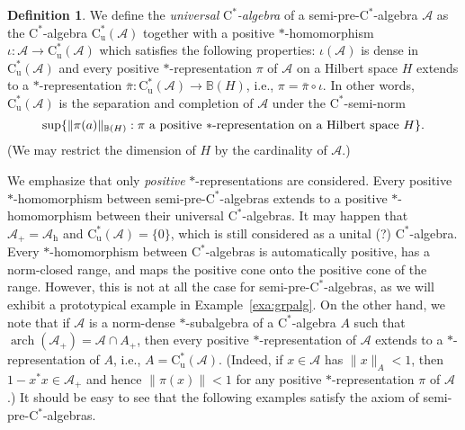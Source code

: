 \documentclass[12pt]{amsart}
\theoremstyle{definition}
\newtheorem*{defn}{Definition}
\begin{document}
\begin{defn}
We define the \emph{universal} \emph{$\mathrm{C}^*$-algebra}
of a {semi-pre-$\mathrm{C}^*$-alge\-bra\xspace} ${{\mathcal A}}$
as the {$\mathrm{C}^*$-alge\-bra\xspace} $\mathrm{C}^*_{\mathrm{u}}({{\mathcal A}})$ together with a positive {$*$-homo\-mor\-phism\xspace}
$\iota\colon{{\mathcal A}}\to\mathrm{C}^*_{\mathrm{u}}({{\mathcal A}})$ which satisfies the following properties:
$\iota({{\mathcal A}})$ is dense in $\mathrm{C}^*_{\mathrm{u}}({{\mathcal A}})$ and
every positive {$*$-repre\-sen\-ta\-tion\xspace} $\pi$ of ${{\mathcal A}}$ on a Hilbert space ${H}$ extends
to a {$*$-repre\-sen\-ta\-tion\xspace} $\bar{\pi}\colon\mathrm{C}^*_{\mathrm{u}}({{\mathcal A}})\to{{\mathbb B}}({H})$,
i.e., $\pi=\bar{\pi}\circ\iota$.
In other words, $\mathrm{C}^*_{\mathrm{u}}({{\mathcal A}})$ is the separation and completion
of ${{\mathcal A}}$ under the $\mathrm{C}^*$-semi-norm
\[
\sup\{ \|\pi(a)\|_{{{\mathbb B}}({H})} :
\pi\mbox{ a positive {$*$-repre\-sen\-ta\-tion\xspace} on a Hilbert space ${H}$}\}.
\]
(We may restrict the dimension of ${H}$ by the cardinality of ${{\mathcal A}}$.)
\end{defn}
We emphasize that only \emph{positive} {$*$-repre\-sen\-ta\-tion\xspace}{}s are considered.
Every positive {$*$-homo\-mor\-phism\xspace} between {semi-pre-$\mathrm{C}^*$-alge\-bra\xspace}{}s
extends to a positive {$*$-homo\-mor\-phism\xspace} between their universal {$\mathrm{C}^*$-alge\-bra\xspace}{}s.
It may happen that ${{\mathcal A}}_+={{\mathcal A}}_{\mathrm{h}}$ and $\mathrm{C}^*_{\mathrm{u}}({{\mathcal A}})=\{0\}$,
which is still considered as a unital (?) {$\mathrm{C}^*$-alge\-bra\xspace}.
Every {$*$-homo\-mor\-phism\xspace} between {$\mathrm{C}^*$-alge\-bra\xspace}{}s is automatically positive, has a norm-closed range,
and maps the positive cone onto the positive cone of the range.
However, this is not at all the case for {semi-pre-$\mathrm{C}^*$-alge\-bra\xspace}{}s, as we will exhibit
a prototypical example in Example~\ref{exa:grpalg}.
On the other hand, we note that if ${{\mathcal A}}$ is a norm-dense $*$-subalgebra of
a {$\mathrm{C}^*$-alge\-bra\xspace} $A$ such that $\operatorname*{arch}({{\mathcal A}}_+)={{\mathcal A}}\cap A_+$, then every
positive {$*$-repre\-sen\-ta\-tion\xspace} of ${{\mathcal A}}$ extends to a {$*$-repre\-sen\-ta\-tion\xspace} of $A$,
i.e., $A=\mathrm{C}^*_{\mathrm{u}}({{\mathcal A}})$.
(Indeed, if $x\in{{\mathcal A}}$ has $\|x\|_A<1$, then $1-x^*x\in{{\mathcal A}}_+$ and hence
$\|\pi(x)\|<1$ for any positive {$*$-repre\-sen\-ta\-tion\xspace} $\pi$ of ${{\mathcal A}}$.)
It should be easy to see that the following examples satisfy the axiom
of {semi-pre-$\mathrm{C}^*$-alge\-bra\xspace}{}s.
\end{document}

